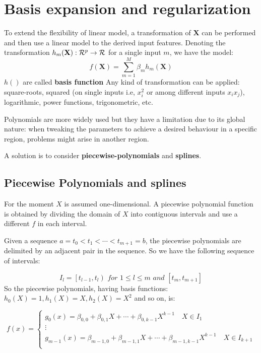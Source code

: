 \documentclass[12pt, letterpaper]{article}
\theoremstyle{definition}
\newcommand{\X}{\mathrm{\mathbf{X}}}
\begin{document}
\section{Basis expansion and regularization}
To extend the flexibility of linear model, a transformation of $\X$ can be performed and then use a linear model to the derived input features. Denoting the transformation $h_m(\X) : \CMcal{R}^p\rightarrow \CMcal	{R}$ for a single input $m$, we have the model:
\begin{equation}
f(\X) = \sum_{m=1}^M \beta_mh_m(\X)
\end{equation}
$h()$ are called \textbf{basis function}
Any kind of transformation can be applied: square-roots, squared (on single inputs i.e, $x_i^2$ or among different inputs $x_ix_j$), logarithmic, power functions, trigonometric, etc. 

Polynomials are more widely used but they have a limitation due to its global nature: when tweaking the  parameters to achieve a desired behaviour in a specific region, problems might arise in another region.

A solution is to consider \textbf{piecewise-polynomials} and \textbf{splines}.

\subsection{Piecewise Polynomials and splines}
For the moment $X$ is assumed one-dimensional. A piecewise polynomial function is obtained by  dividing the domain of $X$ into contiguous intervals and use a different $f$ in each interval.

Given a sequence $a=t_0<t_1<\cdots<t_{m+1}=b$, the piecewise polynomials are delimited by an adjacent pair in the sequence. So we have the following sequence of intervals:

\begin{equation}
I_l = \left[ t_{l-1}, t_l\right) \textit{ for } 1\le l\le m \textit{ and } \left[t_m, t_{m+1}\right]
\end{equation}
So the piecewise polynomials, having basis functions: $h_0(X) = 1, h_1(X) = X, h_2(X) = X^2$ and so on, is:

\begin{equation}
f(x) = \left\{ \begin{array}{ll} g_0(x) = \beta_{0,0} + \beta_{0,1} X + \cdots + \beta_{0,k-1} X^{k-1}\quad X \in I_1 \\ 
\vdots\\
 g_{m-1}(x) = \beta_{m-1,0} + \beta_{m-1,1} X + \cdots + \beta_{m-1,k-1} X^{k-1}\quad X \in I_{k+1} \\  \quad 
\end{array}
 \right.
\end{equation}
\end{document}
